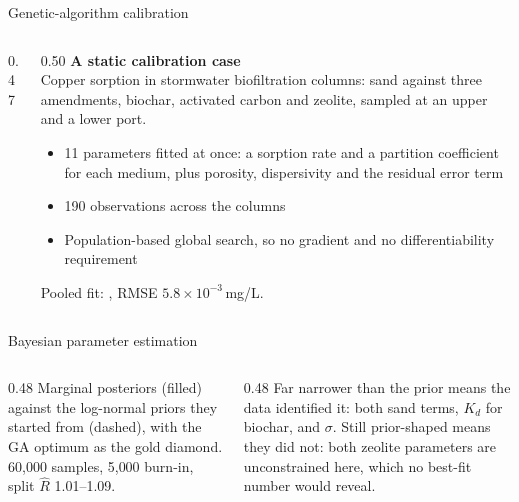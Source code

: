 \documentclass[aspectratio=169, 10pt]{beamer}
\begin{document}
\begin{frame}{Genetic-algorithm calibration}
  \begin{columns}[c,onlytextwidth]
    \begin{column}{0.47\textwidth}
    \end{column}
    \begin{column}{0.50\textwidth}
      \textbf{\small A static calibration case}\\[3pt]
      {\footnotesize Copper sorption in stormwater biofiltration columns: sand
      against three amendments, biochar, activated carbon and zeolite, sampled
      at an upper and a lower port.}
      \vspace{0.5em}
      \begin{itemize}\setlength\itemsep{2pt}
        \item \alert{11 parameters} fitted at once: a sorption rate and a
              partition coefficient for each medium, plus porosity,
              dispersivity and the residual error term
        \item \alert{190 observations} across the columns
        \item Population-based global search, so no gradient and no
              differentiability requirement
      \end{itemize}
      \vspace{0.3em}
      {\footnotesize Pooled fit: ,
      RMSE $5.8\times10^{-3}$\,mg/L.}
    \end{column}
  \end{columns}
\end{frame}

\begin{frame}{Bayesian parameter estimation}
  \centering
  \vspace{0.2em}
  \begin{columns}[T,onlytextwidth]
    \begin{column}{0.48\textwidth}
      {\scriptsize Marginal posteriors (filled) against the log-normal
      \alert{priors} they started from (dashed), with the \alert{GA optimum} as
      the gold diamond. 60{,}000 samples, 5{,}000 burn-in, split
      $\hat{R}$ 1.01--1.09.}
    \end{column}
    \begin{column}{0.48\textwidth}
      {\scriptsize Far narrower than the prior means the data
      \alert{identified} it: both sand terms, $K_d$ for biochar, and $\sigma$.
      Still prior-shaped means they did not: both \alert{zeolite} parameters
      are unconstrained here, which no best-fit number would reveal.}
    \end{column}
  \end{columns}
\end{frame}
\end{document}
